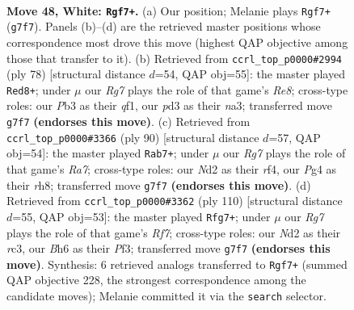 \documentclass[11pt]{article}
\begin{document}
\clearpage

\begin{figure}[p]\centering
\begin{subfigure}{0.46\textwidth}\centering
\resizebox{\linewidth}{!}{%
\newchessgame
\chessboard[
  setfen={5k2/4R1R1/7B/8/1p4P1/pP1p4/P1PN3K/8 w - - 0 48},
  showmover=false,
  pgfstyle=straightmove, color=movearrow, markmove={g7-f7}
]}
\caption{}
\end{subfigure}\hfill
\begin{subfigure}{0.46\textwidth}\centering
\resizebox{\linewidth}{!}{%
\newchessgame
\chessboard[
  setfen={2R1R3/3k4/p7/5pp1/Pp4P1/nB6/2PK3P/5q2 w - - 9 40},
  showmover=false,
  pgfstyle=straightmove, color=movearrow, markmove={e8-d8}
]}
\caption{}
\end{subfigure}
\\[4pt]
\begin{subfigure}{0.46\textwidth}\centering
\resizebox{\linewidth}{!}{%
\newchessgame
\chessboard[
  setfen={1k5r/R1R5/p7/1p6/3p1r2/P7/2P2P2/2K5 w - - 29 46},
  showmover=false,
  pgfstyle=straightmove, color=movearrow, markmove={a7-b7}
]}
\caption{}
\end{subfigure}\hfill
\begin{subfigure}{0.46\textwidth}\centering
\resizebox{\linewidth}{!}{%
\newchessgame
\chessboard[
  setfen={3r2k1/5R1R/5pp1/8/1p3P2/2r2P1P/3p1KP1/8 w - - 2 56},
  showmover=false,
  pgfstyle=straightmove, color=movearrow, markmove={f7-g7}
]}
\caption{}
\end{subfigure}
\caption{\textbf{Move 48, White: \texttt{Rgf7+}.} (a) Our position; Melanie plays \texttt{Rgf7+} (\texttt{g7f7}). Panels (b)--(d) are the retrieved master positions whose correspondence most drove this move (highest QAP objective among those that transfer to it). (b) Retrieved from \texttt{ccrl\_top\_p0000\#2994} (ply 78) [structural distance $d$=54, QAP obj=55]: the master played \texttt{Red8+}; under $\mu$ our \emph{Rg7} plays the role of that game's \emph{Re8}; cross-type roles: our \emph{P}b3 as their \emph{q}f1, our \emph{p}d3 as their \emph{n}a3; transferred move \texttt{g7f7} \textbf{(endorses this move)}. (c) Retrieved from \texttt{ccrl\_top\_p0000\#3366} (ply 90) [structural distance $d$=57, QAP obj=54]: the master played \texttt{Rab7+}; under $\mu$ our \emph{Rg7} plays the role of that game's \emph{Ra7}; cross-type roles: our \emph{N}d2 as their \emph{r}f4, our \emph{P}g4 as their \emph{r}h8; transferred move \texttt{g7f7} \textbf{(endorses this move)}. (d) Retrieved from \texttt{ccrl\_top\_p0000\#3362} (ply 110) [structural distance $d$=55, QAP obj=53]: the master played \texttt{Rfg7+}; under $\mu$ our \emph{Rg7} plays the role of that game's \emph{Rf7}; cross-type roles: our \emph{N}d2 as their \emph{r}c3, our \emph{B}h6 as their \emph{P}f3; transferred move \texttt{g7f7} \textbf{(endorses this move)}. Synthesis: 6 retrieved analogs transferred to \texttt{Rgf7+} (summed QAP objective 228, the strongest correspondence among the candidate moves); Melanie committed it via the \texttt{search} selector.}
\label{fig:thought-m94}
\end{figure}
\end{document}
